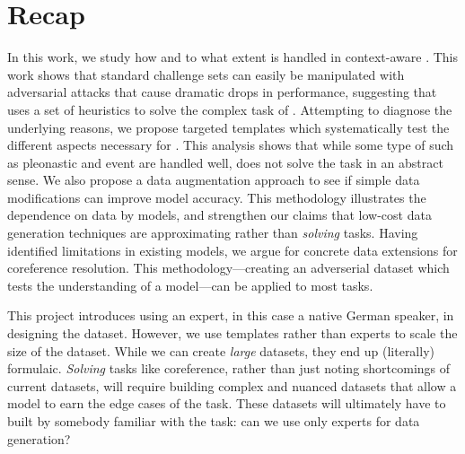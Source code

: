 \section{Recap}

In this work, we study how and to what extent \coref{} is handled in context-aware \nmt{}. 
%
This work shows that standard challenge sets can easily be manipulated with adversarial attacks that cause dramatic drops in performance, suggesting that \nmt{} uses a set of heuristics to solve the complex task of \coref{}. 
%
Attempting to diagnose the underlying reasons, we propose targeted templates which systematically test the different aspects necessary for \coref{}. 
%
This analysis shows that while some type of \coref{} such as pleonastic and event \coref{} are handled well, \nmt{} does not solve the task in an abstract sense. 
%
We also propose a data augmentation approach to see if simple data modifications can improve model accuracy. 
%
This methodology illustrates the dependence on data by models, and strengthen our claims that low-cost data generation techniques are approximating rather than \textit{solving} \nlp{} tasks.  
%
Having identified limitations in existing models, we argue for concrete data extensions for coreference resolution.  
%
This methodology---creating an adverserial dataset which tests the understanding of a model---can be applied to most \nlp{} tasks.  

This project introduces using an expert, in this case a native German speaker, in designing the dataset.  
%
However, we use templates rather than experts to scale the size of the dataset.
%
While we can create \textit{large} datasets, they end up (literally) formulaic.  
%
\textit{Solving} tasks like coreference, rather than just noting shortcomings of current datasets, will require building complex and nuanced datasets that allow a model to earn the edge cases of the task.  
%
These datasets will ultimately have to built by somebody familiar with the task:
can we use only experts for data generation?
